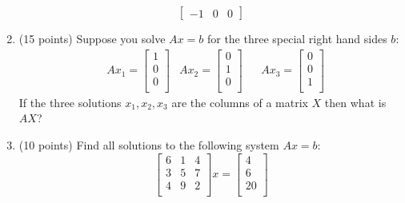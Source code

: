 \documentclass[10pt, a4paper]{article}
\theoremstyle{break}
\begin{document}
\begin{enumerate}
\begin{equation}
\begin{bmatrix}
 -1 & 0 &0
\end{bmatrix}
\end{equation}
\item (15 points) Suppose you solve $Ax=b$ for the three special right hand sides $b$:
\begin{align}
& Ax_1=
\begin{bmatrix}
1 \\
0 \\
0\\
\end{bmatrix}
& Ax_2=
\begin{bmatrix}
0 \\
1 \\
0\\
\end{bmatrix}
& & Ax_3=
\begin{bmatrix}
0 \\
0 \\
1 \\
\end{bmatrix}
\end{align}
If the three solutions $x_1,x_2,x_3$ are the columns of a matrix $X$ then what is $AX$?
\item (10 points) Find all solutions to the following system $Ax=b$:
\begin{equation}
\begin{bmatrix}
6 & 1 & 4 \\
3&5& 7\\
4 & 9 &2 \\
\end{bmatrix}
x=
\begin{bmatrix}
4 \\
6 \\
20 \\
\end{bmatrix}
\end{equation}
\end{enumerate}
\end{document}
